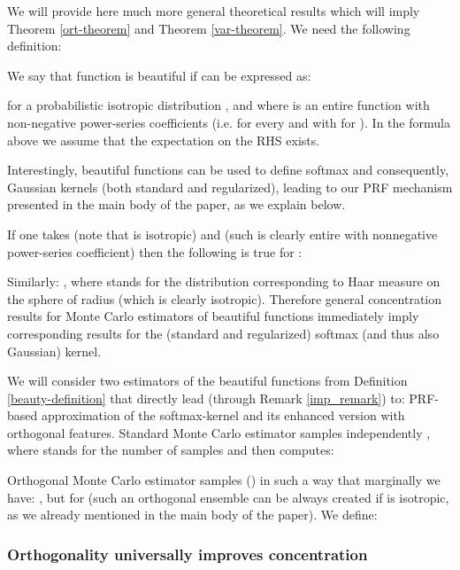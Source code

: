 We will provide here much more general theoretical results which will imply  Theorem \ref{ort-theorem} and Theorem \ref{var-theorem}. We need the following definition:

\begin{definition}
\label{beauty-definition}
We say that function  is beautiful if  can be expressed as:

for a probabilistic isotropic distribution , and where  is an entire function
with non-negative power-series coefficients 
(i.e.  for every  and with  for ).
In the formula above we assume that the expectation on the RHS exists.
\end{definition}

Interestingly, beautiful functions can be used to define softmax and consequently, Gaussian kernels (both standard and regularized), leading to our PRF mechanism presented in the main body of the paper, as we explain below.

\begin{remark}
\label{imp_remark}
If one takes (note that  is isotropic) and  (such  is clearly entire with nonnegative power-series coefficient) then the following is true for :

Similarly: , where  stands for the distribution corresponding to Haar measure on the sphere of radius  (which is clearly isotropic). 
Therefore general concentration results for Monte Carlo estimators of beautiful functions immediately imply corresponding results for the (standard and regularized) softmax (and thus also Gaussian) kernel.
\end{remark}

We will consider two estimators of the beautiful functions from Definition \ref{beauty-definition} that directly lead (through Remark \ref{imp_remark}) to: PRF-based approximation of the softmax-kernel and its enhanced version with orthogonal features. Standard Monte Carlo estimator samples independently , where  stands for the number of samples and then computes:

Orthogonal Monte Carlo estimator samples  () in such a way that marginally we have: , but  for  (such an orthogonal ensemble can be always created if  is isotropic, as we already mentioned in the main body of the paper). We define:


\subsubsection{Orthogonality universally improves concentration}

